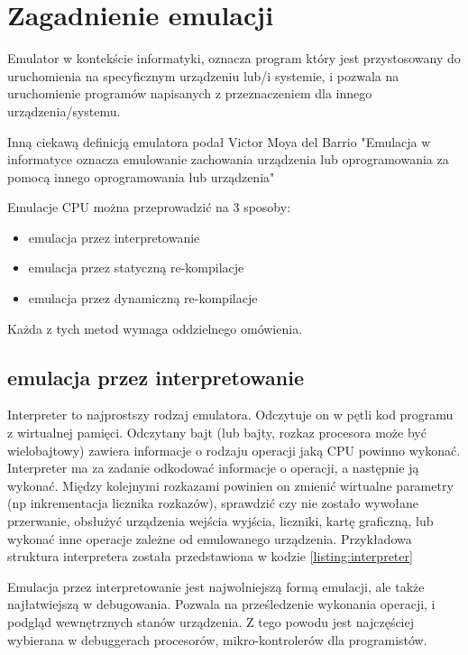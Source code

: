 \chapter{Zagadnienie emulacji}
	
	Emulator w kontekście informatyki, oznacza program który jest przystosowany do uruchomienia na specyficznym urządzeniu lub/i systemie, i pozwala na uruchomienie programów napisanych z przeznaczeniem dla innego urządzenia/systemu. \cite{howDoIWriteAnEmulator}
	
	Inną ciekawą definicją emulatora podał Victor Moya del Barrio "Emulacja w informatyce oznacza emulowanie zachowania urządzenia lub oprogramowania za pomocą innego oprogramowania lub urządzenia" %
	\cite{studyofthetechniquesforemulationprogramming}
		
	Emulacje CPU można przeprowadzić na 3 sposoby:\cite{fms_komkon_org_howto}	
	\begin{itemize}  
		\item emulacja przez interpretowanie
		\item emulacja przez statyczną re-kompilacje
		\item emulacja przez dynamiczną re-kompilacje
	\end{itemize} 
	Każda z tych metod wymaga oddzielnego omówienia.
	
	\section{emulacja przez interpretowanie}
	Interpreter to najprostszy rodzaj emulatora. Odczytuje on w pętli kod programu z wirtualnej pamięci. Odczytany bajt (lub bajty, rozkaz procesora może być wielobajtowy) zawiera informacje o rodzaju operacji jaką CPU powinno wykonać. Interpreter ma za zadanie odkodować informacje o operacji, a następnie ją wykonać. Między kolejnymi rozkazami powinien on zmienić wirtualne parametry (np inkrementacja licznika rozkazów), sprawdzić czy nie zostało wywołane przerwanie, obsłużyć urządzenia wejścia wyjścia, liczniki, kartę graficzną, lub wykonać inne operacje zależne od emulowanego urządzenia. Przykładowa struktura interpretera została przedstawiona w kodzie  \ref{listing:interpreter}
		
	
	
	Emulacja przez interpretowanie jest najwolniejszą formą emulacji, ale także najłatwiejszą w debugowania. Pozwala na prześledzenie wykonania operacji, i podgląd wewnętrznych stanów urządzenia. Z tego powodu jest najczęściej wybierana w debuggerach procesorów, mikro-kontrolerów dla programistów.
	
